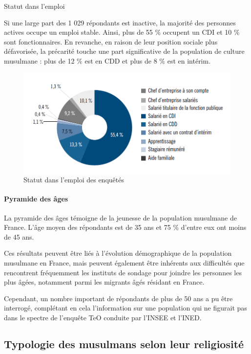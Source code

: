 Statut dans l'emploi


Si une large part des 1 029 répondants est inactive, la majorité des
personnes actives occupe un emploi stable. Ainsi, plus de 55 \% occupent
un CDI et 10 \% sont fonctionnaires. En revanche, en raison de leur
position sociale plus défavorisée, la précarité touche une part
significative de la population de culture musulmane : plus de 12 \% est
en CDD et plus de 8 \% est en intérim.




\begin{figure}
    \centering
    \includegraphics[width=\textwidth]{ImageIslamFrance/Emploi.png}
    \caption{Statut dans l'emploi des enquêtés}
    \label{fig:my_label}
\end{figure}


\paragraph{Pyramide des âges}


La pyramide des âges témoigne de la jeunesse de la population musulmane
de France. L'âge moyen des répondants est de 35 ans et 75 \% d'entre eux
ont moins de 45 ans.

Ces résultats peuvent être liés à l'évolution démographique de la
population musulmane en France, mais peuvent également être inhérents
aux difficultés que rencontrent fréquemment les instituts de sondage
pour joindre les personnes les plus âgées, notamment parmi les migrants
âgés résidant en France.

Cependant, un nombre important de répondants de plus de 50 ans a pu être
interrogé, complétant en cela l'information sur une population qui ne
figurait pas dans le spectre de l'enquête TeO conduite par l'INSEE et
l'INED.





\subsection{Typologie des musulmans selon leur religiosité}


